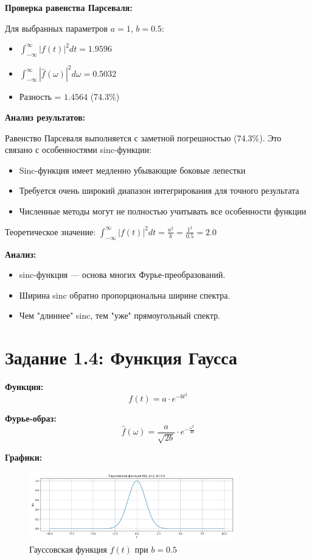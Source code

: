 \textbf{Проверка равенства Парсеваля:}

Для выбранных параметров $a = 1$, $b = 0.5$:
\begin{itemize}
    \item $\displaystyle \int_{-\infty}^{\infty} |f(t)|^2 dt = 1.9596$
    \item $\displaystyle \int_{-\infty}^{\infty} |\hat{f}(\omega)|^2 d\omega = 0.5032$
    \item Разность = $1.4564$ (74.3\%)
\end{itemize}

\textbf{Анализ результатов:}

Равенство Парсеваля выполняется с заметной погрешностью (74.3\%). Это связано с особенностями sinc-функции:
\begin{itemize}
    \item Sinc-функция имеет медленно убывающие боковые лепестки
    \item Требуется очень широкий диапазон интегрирования для точного результата
    \item Численные методы могут не полностью учитывать все особенности функции
\end{itemize}

Теоретическое значение: $\displaystyle \int_{-\infty}^{\infty} |f(t)|^2 dt = \frac{a^2}{b} = \frac{1^2}{0.5} = 2.0$

\textbf{Анализ:}

\begin{itemize}
    \item sinc-функция — основа многих Фурье-преобразований.
    \item Ширина sinc обратно пропорциональна ширине спектра.
    \item Чем "длиннее" sinc, тем "уже" прямоугольный спектр.
\end{itemize}

\section*{Задание 1.4: Функция Гаусса}

\textbf{Функция:}
\[
f(t) = a \cdot e^{-b t^2}
\]

\textbf{Фурье-образ:}
\[
\hat{f}(\omega) = \frac{a}{\sqrt{2b}} \cdot e^{-\frac{\omega^2}{4b}}
\]

\textbf{Графики:}

\begin{figure}[H]
    \centering
    \includegraphics[width=0.8\textwidth]{gauss_function_b0.5.png}
    \caption{Гауссовская функция $f(t)$ при $b = 0.5$}
\end{figure}

